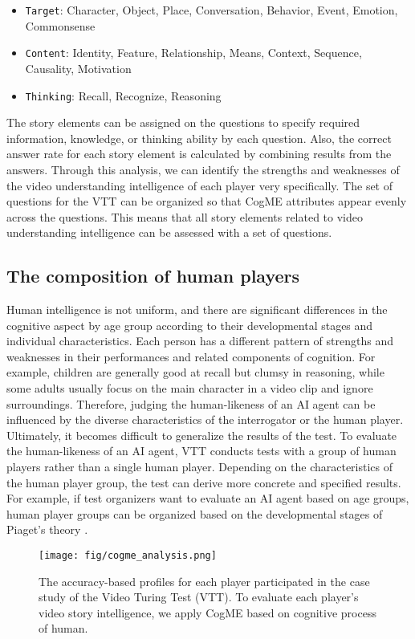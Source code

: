 \documentclass[letterpaper]{article} %
\begin{document}
\begin{itemize}
\item \texttt{Target}: Character, Object, Place, Conversation, Behavior, Event, Emotion, Commonsense
\item \texttt{Content}: Identity, Feature, Relationship, Means, Context, Sequence, Causality, Motivation
\item \texttt{Thinking}: Recall, Recognize, Reasoning
\end{itemize}

The story elements can be assigned on the questions to specify required information, knowledge, or thinking ability by each question. Also, the correct answer rate for each story element is calculated by combining results from the answers. Through this analysis, we can identify the strengths and weaknesses of the video understanding intelligence of each player very specifically.
The set of questions for the VTT can be organized so that CogME attributes appear evenly across the questions. This means that all story elements related to video understanding intelligence can be assessed with a set of questions.

\subsection{The composition of human players}
Human intelligence is not uniform, and there are significant differences in the cognitive aspect by age group according to their developmental stages and individual characteristics. Each person has a different pattern of strengths and weaknesses in their performances and related components of cognition. For example, children are generally good at recall but clumsy in reasoning, while some adults usually focus on the main character in a video clip and ignore surroundings. Therefore, judging the human-likeness of an AI agent can be influenced by the diverse characteristics of the interrogator or the human player. Ultimately, it becomes difficult to generalize the results of the test. To evaluate the human-likeness of an AI agent, VTT conducts tests with a group of human players rather than a single human player. Depending on the characteristics of the human player group, the test can derive more concrete and specified results. For example, if test organizers want to evaluate an AI agent based on age groups, human player groups can be organized based on the developmental stages of Piaget's theory \cite{Piaget1972CogDev}.

\begin{figure*}[t]
\centering
\texttt{[image: fig/cogme\_analysis.png]}
\caption{The accuracy-based profiles for each player participated in the case study of the Video Turing Test (VTT). To evaluate each player's video story intelligence, we apply CogME based on cognitive process of human.}
\label{fig:analysis}
\end{figure*}
\end{document}
